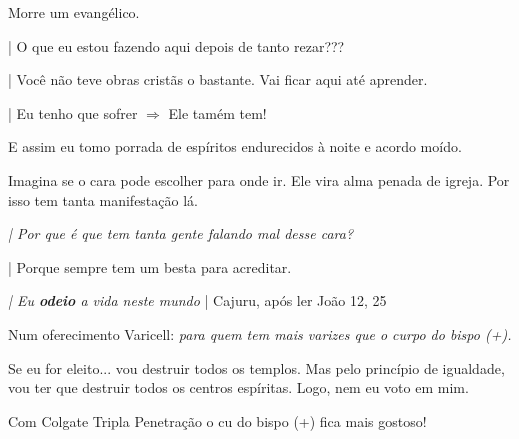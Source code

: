 \documentclass[12pt,a4paper]{article}
\begin{document}
		\begin{flushright}
		\end{flushright}

		Morre um evang\'elico.

		| O que eu estou fazendo aqui depois de tanto rezar???

		| Voc\^e n\~ao teve obras\cite{x} crist\~as\cite{x} o bastante. Vai ficar aqui at\'e aprender.

		| Eu tenho que sofrer\cite{goecia} $ \Rightarrow $ Ele tam\'em tem!

		E assim eu tomo porrada de esp\'iritos endurecidos \`a noite e acordo mo\'ido.

		\begin{flushright}
		\end{flushright}

		Imagina se o cara pode escolher para onde ir. Ele vira alma penada de igreja\cite{x}. Por isso tem tanta manifesta\c{c}\~ao l\'a.

		\begin{flushright}
		\end{flushright}

		\emph{| Por que \'e que tem tanta gente falando mal desse cara?}

		| Porque sempre tem um besta para acreditar.

		\begin{flushright}
		\end{flushright}

		\emph{| Eu \textbf{odeio} a vida neste mundo} | Cajuru, ap\'os ler Jo\~ao 12, 25

		\begin{flushright}
		\end{flushright}

		Num oferecimento Varicell: \emph{para quem tem mais varizes que o curpo do bispo (+).}

		\begin{flushright}
		\end{flushright}

		Se eu for eleito... vou destruir todos os templos\cite{x}. Mas pelo princ\'ipio de igualdade\cite{x}, vou ter que destruir todos os centros esp\'iritas. Logo, nem eu voto em mim.

		\begin{flushright}
		\end{flushright}

		Com Colgate Tripla Penetra\c{c}\~ao o cu do bispo (+) fica mais gostoso! %
\end{document}
